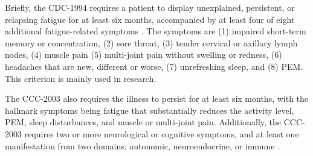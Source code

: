 Briefly, the CDC-1994 requires a patient to display unexplained, persistent, or relapsing fatigue for at least six months, accompanied by at least four of eight additional fatigue-related symptoms \citep{fukuda1994ChronicFatigue}.
The symptoms are (1) impaired short-term memory or concentration, (2) sore throat, (3) tender cervical or axillary lymph nodes, (4) muscle pain (5) multi-joint pain without swelling or redness, (6) headaches that are new, different or worse, (7) unrefreshing sleep, and (8) PEM.
This criterion is mainly used in research.
% 
    

The CCC-2003 also requires the illness to persist for at least six months, with the hallmark symptoms being fatigue that substantially reduces the activity level, PEM, sleep disturbances, and muscle or multi-joint pain.
Additionally, the CCC-2003 requires two or more neurological or cognitive symptoms, and at least one manifestation from two domains: autonomic, neuroendocrine, or immune \citep{carruthers2003MyalgicEncephalomyelitis}.

